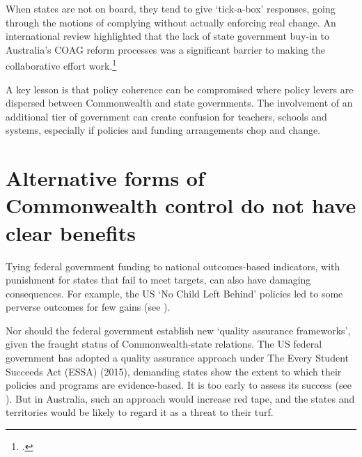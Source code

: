When states are not on board, they tend to give `tick-a-box' responses, going through the motions of complying without actually enforcing real change. An international review highlighted that the lack of state government buy-in to Australia's COAG reform processes was a significant barrier to making the collaborative effort work.\footcite{HowesEngele2013WhytheCOAGReformAgendaHasFloundered, HowesEngele2013FederalReformStrategies}

A key lesson is that policy coherence can be compromised where policy levers are dispersed between Commonwealth and state governments. The involvement of an additional tier of government can create confusion for teachers, schools and systems, especially if policies and funding arrangements chop and change.

\section{Alternative forms of Commonwealth control do not have clear benefits}\label{sec:other-approaches}

Tying federal government funding to national outcomes-based indicators, with punishment for states that fail to meet targets, can also have damaging consequences. For example, the US `No Child Left Behind' policies led to some perverse outcomes for few gains (see ).

Nor should the federal government establish new `quality assurance frameworks', given the fraught status of Commonwealth-state relations. The US federal government has adopted a quality assurance approach under The Every Student Succeeds Act (ESSA) (2015), demanding states show the extent to which their policies and programs are evidence-based. It is too early to assess its success (see ). But in Australia, such an approach would increase red tape, and the states and territories would be likely to regard it as a threat to their turf.

